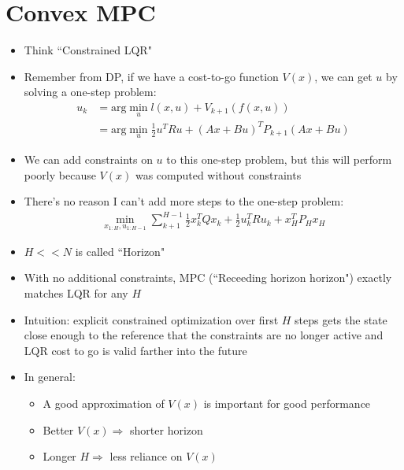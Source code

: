\documentclass[11pt]{article}
\begin{document}
\section{Convex MPC}
\begin{itemize}
    \item Think ``Constrained LQR"
    \item Remember from DP, if we have a cost-to-go function $V(x)$, we can get $u$ by solving a one-step problem:
    \begin{align*}
        u_k &= \text{arg}\min_u l(x,u) + V_{k+1}(f(x,u))
        \\
        &= \text{arg}\min_u \frac{1}{2}u^TRu + (Ax+Bu)^TP_{k+1}(Ax+Bu)
    \end{align*}
    \item We can add constraints on $u$ to this one-step problem, but this will perform poorly because $V(x)$ was computed without constraints
    \item There's no reason I can't add more steps to the one-step problem:
    \begin{align*}
        \min_{x_{1:H},u_{1:H-1}}\sum_{k+1}^{H-1}\frac{1}{2}x_k^TQx_k + \frac{1}{2}u_k^TRu_k + x_H^TP_Hx_H
    \end{align*}
    \item $H<<N$ is called ``Horizon"
    \item With no additional constraints, MPC (``Receeding horizon horizon") exactly matches LQR for any $H$
    \item Intuition: explicit constrained optimization over first $H$ steps gets the state close enough to the reference that the constraints are no longer active and LQR cost to go is valid farther into the future
    \item In general:
    \begin{itemize}
        \item A good approximation of $V(x)$ is important for good performance
        \item Better $V(x)\Rightarrow$ shorter horizon
        \item Longer $H\Rightarrow$ less reliance on $V(x)$
    \end{itemize}
\end{itemize}
\end{document}
